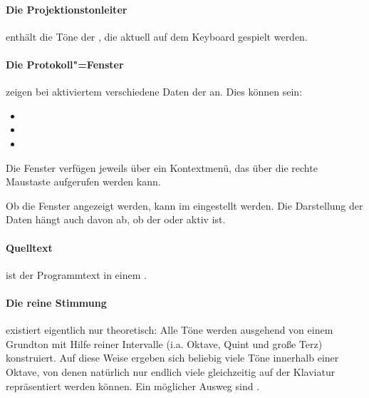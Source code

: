 \paragraph{Die Projektionstonleiter}\label{sec:DV_PROJTONLEITER}
  enthält die Töne der
  , die aktuell auf dem
  Keyboard gespielt werden.

\paragraph{Die Protokoll"=Fenster}\label{sec:DV_PROTOKOLL} 
  zeigen bei aktiviertem 
  verschiedene Daten der  an. Dies können
  sein:
  \begin{itemize}
  \item {}
  \item {}
  \item {}
  \end{itemize}
  Die Fenster verfügen jeweils über ein Kontextmenü, das über die
  rechte Maustaste aufgerufen werden kann.

  Ob die Fenster angezeigt werden, kann im
   eingestellt werden. Die
  Darstellung der Daten hängt auch davon ab, ob der
   oder
   aktiv
  ist.

\paragraph{Quelltext}\label{sec:DV_QUELLTEXT} ist der
  Programmtext in einem .

\paragraph{Die reine Stimmung}\label{sec:MT_JUST} existiert eigentlich nur
  theoretisch: Alle Töne werden ausgehend von einem Grundton mit Hilfe
  reiner Intervalle (i.a.  Oktave, Quint und große Terz) konstruiert.
  Auf diese Weise ergeben sich beliebig viele Töne innerhalb einer
  Oktave, von denen natürlich nur endlich viele gleichzeitig auf der
  Klaviatur repräsentiert werden können. Ein möglicher Ausweg sind
  .

